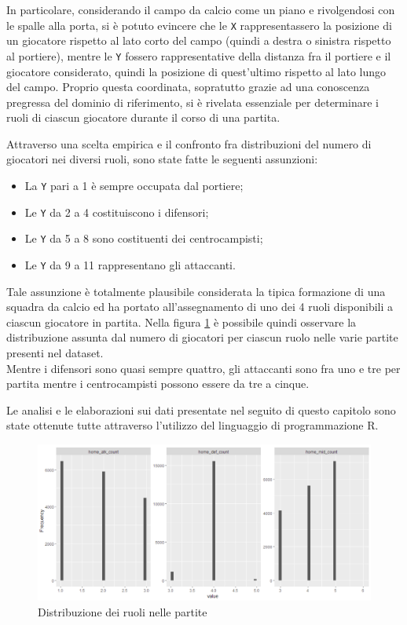 \documentclass[hidelinks, 12pt]{article}
\begin{document}
In particolare, considerando il campo da calcio come un piano e rivolgendosi con le spalle alla porta, si è potuto evincere che le \texttt{X} rappresentassero la posizione di un giocatore rispetto al lato corto del campo (quindi a destra o sinistra rispetto al portiere), mentre le \texttt{Y} fossero rappresentative della distanza fra il portiere e il giocatore considerato, quindi la posizione di quest'ultimo rispetto al lato lungo del campo. Proprio questa coordinata, sopratutto grazie ad una conoscenza pregressa del dominio di riferimento, si è rivelata essenziale per determinare i ruoli di ciascun giocatore durante il corso di una partita.

Attraverso una scelta empirica e il confronto fra distribuzioni del numero di giocatori nei diversi ruoli, sono state fatte le seguenti assunzioni:

\begin{itemize}
	\item La \texttt{Y} pari a 1 è sempre occupata dal portiere;
	\item Le \texttt{Y} da 2 a 4 costituiscono i difensori;
	\item Le \texttt{Y} da 5 a 8 sono costituenti dei centrocampisti;
	\item Le \texttt{Y} da 9 a 11 rappresentano gli attaccanti.
\end{itemize}

Tale assunzione è totalmente plausibile considerata la tipica formazione di una squadra da calcio ed ha portato all'assegnamento di uno dei 4 ruoli disponibili a ciascun giocatore in partita. Nella figura \ref{fig:dataset-roles-distr} è possibile quindi osservare la distribuzione assunta dal numero di giocatori per ciascun ruolo nelle varie partite presenti nel dataset. \\
Mentre i difensori sono quasi sempre quattro, gli attaccanti sono fra uno e tre per partita mentre i centrocampisti possono essere da tre a cinque.

\vspace{2ex}

Le analisi e le elaborazioni sui dati presentate nel seguito di questo capitolo sono state ottenute tutte attraverso l'utilizzo del linguaggio di programmazione R.

\begin{figure}[H]
	\centering
	\includegraphics[scale=0.6]{images/04_01_roles_distribution.png}
	\caption[Distribuzione dei ruoli nelle partite]{Distribuzione dei ruoli nelle partite}
	\label{fig:dataset-roles-distr}
\end{figure}
\end{document}
